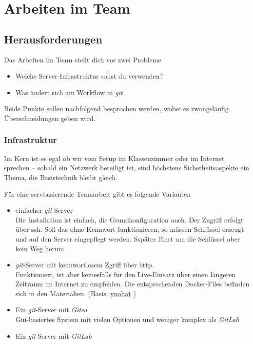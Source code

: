 \documentclass[
  letterpaper,
  DIV=11]{scrreprt}
\providecommand{\tightlist}{%
  \setlength{\itemsep}{0pt}\setlength{\parskip}{0pt}}\usepackage{longtable,booktabs,array}
\newcommand{\git}{\textit{git}\xspace}
\begin{document}

\chapter{Arbeiten im Team}\label{arbeiten-im-team}

\section{Herausforderungen}\label{herausforderungen}

Das Arbeiten im Team stellt dich vor zwei Probleme

\begin{itemize}
\tightlist
\item
  Welche Server-Infrastruktur sollst du verwenden?
\item
  Was ändert sich am Workflow in \git 
\end{itemize}

Beide Punkte sollen nachfolgend besprochen werden, wobei es zwangsläufig
Überschneidungen geben wird.

\subsection{Infrastruktur}\label{infrastruktur}

Im Kern ist es egal ob wir vom Setup im Klassenzimmer oder im Internet
sprechen -- sobald ein Netzwerk beteiligt ist, sind höchstens
Sicherheitsaspekte ein Thema, die Basistechnik bleibt gleich.

Für eine servbasierende Teamarbeit gibt es folgende Varianten

\begin{itemize}
\item
  einfacher \git-Server\\
  Die Installation ist einfach, die Grundkonfiguration auch. Der Zugriff
  erfolgt über ssh. Soll das ohne Kennwort funktionieren, so müssen
  Schlüssel erzeugt und auf den Server eingepflegt werden. Sspäter führt
  um die Schlüssel aber kein Weg herum.
\item
  \git-Server mit kennwortlosem Zgriff über http.\\
  Funktioniert, ist aber keinesfalls für den Live-Einsatz über einen
  längeren Zeitraum im Internet zu empfehlen. Die entsprechenden
  Docker-Files befinden sich in den Materialien. (Basis:
  \href{https://github.com/ynohat/git-http-backend}{ynohat} )
\item
  Ein \git-Server mit \emph{Gitea}\\
  Gui-basiertes System mit vielen Optionen und weniger komplex als
  \emph{GitLab}
\item
  Ein \git-Server mit \emph{GitLab}
\end{itemize}
\end{document}
